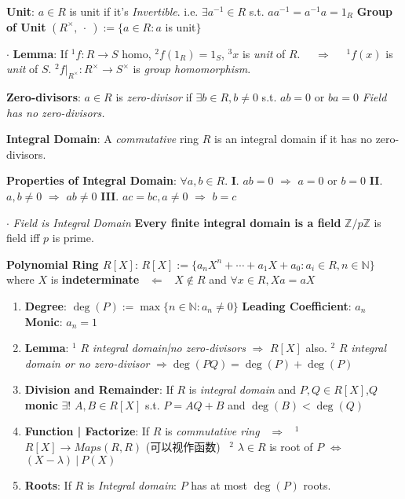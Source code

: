 \documentclass[9pt]{article}
\begin{document}
\textbf{Unit}: $a\in R$ is unit if it's \textit{Invertible}. \quad i.e. $\exists a^{-1}\in R$ s.t. $aa^{-1}=a^{-1} a=1_R$ \qquad \textbf{Group of Unit} $(R^{\times},\ \cdot \ ):=\{a\in R:a$ is unit$\}$

$\cdot$ \textbf{Lemma}: If $^1f:R\to S$ homo, $^2f(1_R)=1_S$, $^3x$ is \textit{unit} of $R$. \ \ $\Rightarrow$ \ \ $^1f(x)$ is \textit{unit} of $S$. \quad $^2f|_{R^\times}:R^\times\to S^\times$ is \textit{group homomorphism}.

\textbf{Zero-divisors}: $a\in R$ is \textit{zero-divisor} if $\exists b\in R,b\ne0$ s.t. $ab=0$ or $ba=0$ \qquad \textit{Field has no zero-divisors.}  

\textbf{Integral Domain}: A \textit{commutative} ring $R$ is an integral domain if it has no zero-divisors. \qquad {}

\textbf{Properties of Integral Domain}: $\forall a,b\in R$. \quad \textbf{I}. $ab=0$ $\Rightarrow$ $a=0$ or $b=0$ \quad \textbf{II}. $a,b\ne0$ $\Rightarrow$ $ab\ne0$ \qquad \textbf{III}. $ac=bc,a\ne0$ $\Rightarrow$ $b=c$

$\cdot$ \textit{Field is Integral Domain} \qquad \textbf{Every finite integral domain is a field} \qquad $\mathbb{Z}/p\mathbb{Z}$ is field iff $p$ is prime. 

\textbf{Polynomial Ring $R[X]$}: $R[X]:=\{a_nX^n+\cdots+a_1X+a_0:a_i\in R,n\in\mathbb{N}\}$ where $X$ is \textbf{indeterminate} \ $\Leftarrow$ \ $X\notin R$ and $\forall x\in R,Xa=aX$

\begin{enumerate}[itemsep=-2pt, topsep=-2pt]
    \item \textbf{Degree}: $\deg(P):=\max\{n\in\mathbb{N}:a_n\ne0\}$ \quad \textbf{Leading Coefficient}: $a_n$ \quad \textbf{Monic}: $a_n=1$ \quad \quad {}
    \item \textbf{Lemma}: {\small $^1$ $R$ \textit{integral domain|no zero-divisors} $\Rightarrow$ $R[X]$ also. \qquad $^2$ $R$ \textit{integral domain or no zero-divisor} $\Rightarrow\deg(PQ)=\deg(P)+\deg(P)$}
    \item \textbf{Division and Remainder}: If $R$ is \textit{integral domain} and $P,Q\in R[X]$,{\scriptsize $Q$ \textbf{monic}} $\exists!$ $A,B\in R[X]$ s.t. $P=AQ+B$ and $\deg(B)<\deg(Q)$
    \item \textbf{Function | Factorize}: If $R$ is \textit{commutative ring} \ $\Rightarrow$ \ $^1$ $R[X]\to Maps(R,R)$ {\scriptsize (可以视作函数)} \ $^2$ $\lambda\in R$ is root of $P$ $\Leftrightarrow$ $(X-\lambda) \ | \ P(X)$
    \item \textbf{Roots}: If $R$ is \textit{Integral domain}: $P$ has at most $\deg(P)$ roots.
\end{enumerate}
\end{document}

